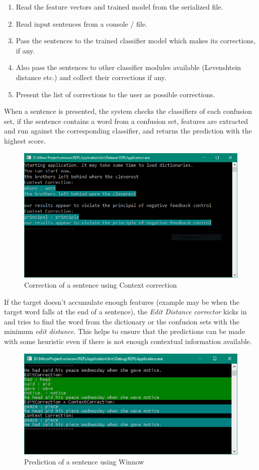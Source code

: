 
\begin{enumerate}
\item Read the feature vectors and trained model from the serialized file.
\item Read input sentences from a console / file.
\item Pass the sentences to the trained classifier model which makes its corrections, if any.
\item Also pass the sentences to other classifier modules available (Levenshtein distance etc.) and collect their corrections if any.
\item Present the list of corrections to the user as possible corrections.
\end{enumerate}

When a sentence is presented, the system checks the classifiers of each
confusion set, if the sentence contains a word from a confusion set, features
are extracted and run against the corresponding classifier, and returns the
prediction with the highest score.

\begin{figure}[H]
    \centering
    \caption{Correction of a sentence using Context correction}
    \includegraphics[width=130mm]{img/context.png}
\end{figure}

If the target doesn't accumulate enough features (example may be when the
target word falls at the end of a sentence), the \textit{Edit Distance
corrector} kicks in and tries to find the word from the dictionary or the
confusion sets with the minimum \textit{edit distance}. This helps to ensure
that the predictions can be made with some heuristic even if there is not
enough contextual information available.

\begin{figure}[H]
    \centering
    \caption{Prediction of a sentence using Winnow}
    \includegraphics[width=130mm]{img/context+edit1.png}
\end{figure}

